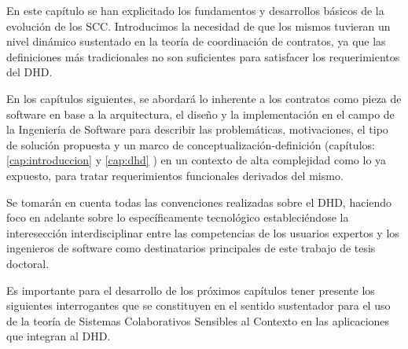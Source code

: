 En este capítulo se han explicitado los fundamentos y desarrollos básicos de la evolución
de los SCC. Introducimos la necesidad de que los mismos tuvieran un nivel dinámico sustentado en la teoría de coordinación de
contratos, ya que las definiciones más tradicionales no son suficientes para satisfacer los requerimientos del DHD.

En los capítulos siguientes, se abordará lo inherente a los contratos como pieza de software en base a la arquitectura, el diseño y la
implementación en el campo de la Ingeniería de Software para describir las problemáticas, motivaciones,
el tipo de solución propuesta y un marco de conceptualización-definición
(capítulos: \ref{cap:introduccion} y \ref{cap:dhd} ) en un contexto de alta
complejidad como lo ya expuesto, para tratar requerimientos funcionales derivados del mismo. 

Se tomarán en cuenta todas las convenciones realizadas sobre el
DHD, haciendo foco en adelante sobre lo específicamente tecnológico estableciéndose la interesección interdisciplinar entre las competencias de los usuarios expertos y los ingenieros de software como destinatarios principales de este trabajo de tesis doctoral. 

Es importante para el desarrollo de los próximos capítulos tener presente los
siguientes interrogantes que se constituyen en el sentido sustentador para el
uso de la teoría de Sistemas Colaborativos Sensibles al Contexto en las
aplicaciones que integran al DHD. 



